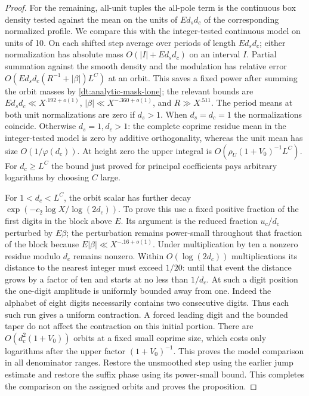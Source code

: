\documentclass[11pt,a4paper]{article}
\theoremstyle{paperplain}
\numberwithin{equation}{section}
\begin{document}
\begin{proof}
For the remaining, all-unit tuples the all-pole term is the
continuous box density tested against the mean on the units
of \(Ed_s d_c\) of the corresponding normalized profile.
We compare this with the integer-tested continuous model on
units of 10. On each shifted step average over periods of
length \(Ed_s d_c\); either normalization has absolute mass
\(O(|I|+Ed_s d_c)\) on an interval \(I\).
Partial summation against the smooth density and the modulation
has relative error \(O(Ed_s d_c(R^{-1}+|\beta|)L^C)\) at an
orbit. This saves a fixed power after summing the orbit masses
by \eqref{dt:analytic-mask-lone}; the relevant bounds are
\(Ed_s d_c\ll X^{.192+o(1)}\),
\(|\beta|\ll X^{-.360+o(1)}\), and \(R\gg X^{.511}\).
The period means at both unit normalizations are zero if
\(d_s>1\). When \(d_s=d_c=1\) the normalizations coincide.
Otherwise \(d_s=1,d_c>1\): the complete coprime residue mean
in the integer-tested model is zero by additive orthogonality,
whereas the unit mean has size \(O(1/\varphi(d_c))\).
At height zero the upper integral is
\(O(\rho_U(1+V_0)^{-1}L^C)\).
For \(d_c\ge L^C\) the bound just proved for principal coefficients
pays arbitrary logarithms by choosing \(C\) large.

For \(1<d_c<L^C\), the orbit scalar has further decay
\(\exp(-c_2\log X/\log(2d_c))\). To prove this use a fixed
positive fraction of the first digits in the block above \(E\).
Its argument is the reduced fraction \(u_c/d_c\) perturbed by
\(E\beta\); the perturbation remains power-small throughout
that fraction of the block because \(E|\beta|\ll X^{-.16+o(1)}\).
Under multiplication by ten a nonzero residue modulo \(d_c\)
remains nonzero. Within \(O(\log(2d_c))\) multiplications its
distance to the nearest integer must exceed \(1/20\):
until that event the distance grows by a factor of ten and
starts at no less than \(1/d_c\). At such a digit position the
one-digit amplitude is uniformly bounded away from one.
Indeed the alphabet of eight digits necessarily contains two
consecutive digits. Thus each such run gives a uniform
contraction. A forced leading digit and the bounded taper do
not affect the contraction on this initial portion.
There are \(O(d_c^2(1+V_0))\) orbits at a fixed small
coprime size, which costs only logarithms after the upper
factor \((1+V_0)^{-1}\). This proves the model comparison in
all denominator ranges. Restore the unsmoothed step using
the earlier jump estimate and restore the suffix phase using
its power-small bound. This completes the comparison on the
assigned orbits and proves the proposition.
\end{proof}
\end{document}
